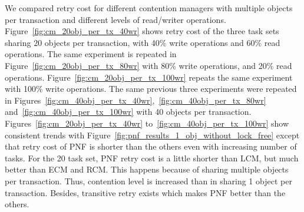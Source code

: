 We compared retry cost for different contention managers with multiple objects per transaction and different levels of read/writer operations. Figure~\ref{fig:cm_20obj_per_tx_40wr} shows retry cost of the three task sets sharing 20 objects per transaction, with 40\% write operations and 60\% read operations. The same experiment is repeated in Figure~\ref{fig:cm_20obj_per_tx_80wr} with 80\% write operations, and 20\% read operations. Figure~\ref{fig:cm_20obj_per_tx_100wr} repeats the same experiment with 100\% write operations. The same previous three experiments were repeated in Figures~\ref{fig:cm_40obj_per_tx_40wr},~\ref{fig:cm_40obj_per_tx_80wr} and~\ref{fig:cm_40obj_per_tx_100wr} with 40 objects per transaction. Figures~\ref{fig:cm_20obj_per_tx_40wr} to~\ref{fig:cm_40obj_per_tx_100wr} show consistent trends with Figure~\ref{fig:pnf_results_1_obj_without_lock_free} except that retry cost of PNF is shorter than the others even with increasing number of tasks. For the 20 task set, PNF retry cost is a little shorter than LCM, but much better than ECM and RCM. This happens because of sharing multiple objects per transaction. Thus, contention level is increased than in sharing 1 object per transaction. Besides, transitive retry exists which makes PNF better than the others.

